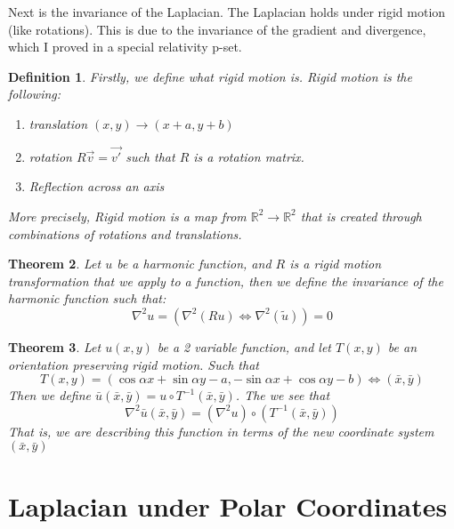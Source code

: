 \documentclass{article}
\newtheorem{theorem}{Theorem}[section]
\newtheorem{definition}[theorem]{Definition}
\begin{document}
Next is the invariance of the Laplacian. The Laplacian holds under rigid motion (like rotations). This is due to the invariance of the gradient and divergence, which I proved in a special relativity p-set.

\begin{definition}
    Firstly, we define what rigid motion is. Rigid motion is the following:
    \begin{enumerate}
        \item translation $(x,y) \rightarrow (x + a, y + b)$
        \item rotation $R\vec{v} = \vec{v'}$ such that $R$ is a rotation matrix. 
        \item Reflection across an axis
    \end{enumerate}
    More precisely, Rigid motion is a map from $\mathbb{R}^2 \rightarrow \mathbb{R}^2$ that is created through combinations of rotations and translations. 
\end{definition}

\begin{theorem}
    Let $u$ be a harmonic function, and $R$ is a rigid motion transformation that we apply to a function, then we define the invariance of the harmonic function such that:
    \begin{equation}
        \nabla^2u = (\nabla^2(Ru) \iff \nabla^2(\tilde{u})) = 0
    \end{equation}
\end{theorem}

\begin{theorem}
    Let $u(x,y)$ be a 2 variable function, and let $T(x,y)$ be an orientation preserving rigid motion. Such that 
    \begin{equation}
        T(x,y) = (\cos\alpha x + \sin\alpha y - a, -\sin\alpha x + \cos\alpha y - b) \iff (\bar{x}, \bar{y})
    \end{equation}
    Then we define $\bar{u}(\bar{x}, \bar{y}) = u \circ T^{-1}(\bar{x}, \bar{y})$. The we see that 
    \begin{equation}
        \nabla^2\bar{u}(\bar{x}, \bar{y}) = (\nabla^2u) \circ (T^{-1}(\bar{x}, \bar{y}))
    \end{equation}
    That is, we are describing this function in terms of the new coordinate system $(\bar{x}, \bar{y})$
\end{theorem}

\section*{Laplacian under Polar Coordinates}
\end{document}

